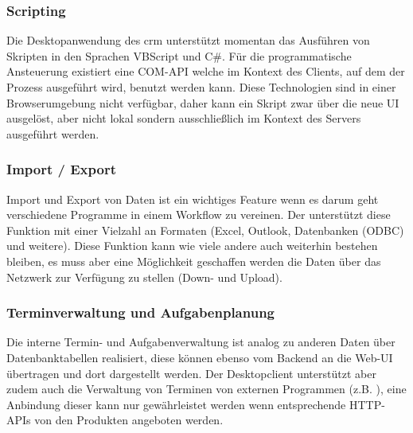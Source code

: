\subsubsection{Scripting}
Die Desktopanwendung des \gls{crm} unterstützt momentan das Ausführen von Skripten in den Sprachen VBScript und C\#. Für die programmatische Ansteuerung existiert eine \gls{COM}-API welche im Kontext des Clients, auf dem der Prozess ausgeführt wird, benutzt werden kann. Diese Technologien sind in einer Browserumgebung nicht verfügbar, daher kann ein Skript zwar über die neue UI ausgelöst, aber nicht lokal sondern ausschließlich im Kontext des Servers ausgeführt werden.

\subsubsection{Import / Export}
Import und Export von Daten ist ein wichtiges Feature wenn es darum geht verschiedene Programme in einem Workflow zu vereinen. Der  unterstützt diese Funktion mit einer Vielzahl an Formaten (Excel, Outlook, Datenbanken (ODBC) und weitere). Diese Funktion kann wie viele andere auch weiterhin bestehen bleiben, es muss aber eine Möglichkeit geschaffen werden die Daten über das Netzwerk zur Verfügung zu stellen (Down- und Upload).

\subsubsection{Terminverwaltung und Aufgabenplanung}
Die interne Termin- und Aufgabenverwaltung ist analog zu anderen Daten über Datenbanktabellen realisiert, diese können ebenso vom Backend an die Web-UI übertragen und dort dargestellt werden. Der Desktopclient unterstützt aber zudem auch die Verwaltung von Terminen von externen Programmen (z.B. ), eine Anbindung dieser kann nur gewährleistet werden wenn entsprechende HTTP-APIs von den Produkten angeboten werden.

